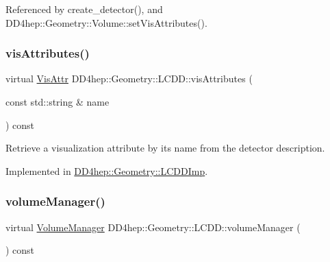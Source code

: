 Referenced by create\+\_\+detector(), and D\+D4hep\+::\+Geometry\+::\+Volume\+::set\+Vis\+Attributes().

\hypertarget{class_d_d4hep_1_1_geometry_1_1_l_c_d_d_a449330acbb5a5d6ba6f1fa2d97cea338}{}\label{class_d_d4hep_1_1_geometry_1_1_l_c_d_d_a449330acbb5a5d6ba6f1fa2d97cea338} 
\subsubsection{\texorpdfstring{vis\+Attributes()}{visAttributes()}\hspace{0.1cm}{\footnotesize\ttfamily [2/2]}}
{\footnotesize\ttfamily virtual \hyperlink{class_d_d4hep_1_1_geometry_1_1_vis_attr}{Vis\+Attr} D\+D4hep\+::\+Geometry\+::\+L\+C\+D\+D\+::vis\+Attributes (\begin{DoxyParamCaption}\item[{const std\+::string \&}]{name }\end{DoxyParamCaption}) const\hspace{0.3cm}{\ttfamily [pure virtual]}}



Retrieve a visualization attribute by it\textquotesingle{}s name from the detector description. 



Implemented in \hyperlink{class_d_d4hep_1_1_geometry_1_1_l_c_d_d_imp_ae2b0ac78fccc1b8a61661de2f8df03f4}{D\+D4hep\+::\+Geometry\+::\+L\+C\+D\+D\+Imp}.

\hypertarget{class_d_d4hep_1_1_geometry_1_1_l_c_d_d_a2112b2267f5f07ecc94e909d696ffdbd}{}\label{class_d_d4hep_1_1_geometry_1_1_l_c_d_d_a2112b2267f5f07ecc94e909d696ffdbd} 
\subsubsection{\texorpdfstring{volume\+Manager()}{volumeManager()}}
{\footnotesize\ttfamily virtual \hyperlink{class_d_d4hep_1_1_geometry_1_1_volume_manager}{Volume\+Manager} D\+D4hep\+::\+Geometry\+::\+L\+C\+D\+D\+::volume\+Manager (\begin{DoxyParamCaption}{ }\end{DoxyParamCaption}) const\hspace{0.3cm}{\ttfamily [pure virtual]}}



